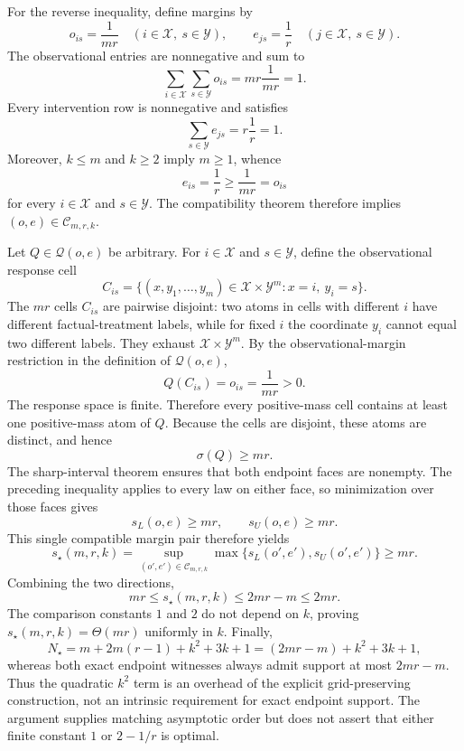 For the reverse inequality, define margins by
\[
o_{is}=\frac1{mr}
\quad(i\in\mathcal X,\ s\in\mathcal Y),
\qquad
e_{js}=\frac1r
\quad(j\in\mathcal X,\ s\in\mathcal Y).
\]
The observational entries are nonnegative and sum to
\[
\sum_{i\in\mathcal X}\sum_{s\in\mathcal Y}o_{is}
=mr\frac1{mr}=1.
\]
Every intervention row is nonnegative and satisfies
\[
\sum_{s\in\mathcal Y}e_{js}=r\frac1r=1.
\]
Moreover, \(k\leq m\) and \(k\geq2\) imply \(m\geq1\), whence
\[
e_{is}=\frac1r\geq\frac1{mr}=o_{is}
\]
for every \(i\in\mathcal X\) and \(s\in\mathcal Y\).  The compatibility theorem therefore implies \((o,e)\in\mathcal C_{m,r,k}\).

Let \(Q\in\mathcal Q(o,e)\) be arbitrary.  For \(i\in\mathcal X\) and \(s\in\mathcal Y\), define the observational response cell
\[
C_{is}=\{(x,y_1,\ldots,y_m)\in\mathcal X\times\mathcal Y^m:x=i,\ y_i=s\}.
\]
The \(mr\) cells \(C_{is}\) are pairwise disjoint: two atoms in cells with different \(i\) have different factual-treatment labels, while for fixed \(i\) the coordinate \(y_i\) cannot equal two different labels.  They exhaust \(\mathcal X\times\mathcal Y^m\).  By the observational-margin restriction in the definition of \(\mathcal Q(o,e)\),
\[
Q(C_{is})=o_{is}=\frac1{mr}>0.
\]
The response space is finite.  Therefore every positive-mass cell contains at least one positive-mass atom of \(Q\).  Because the cells are disjoint, these atoms are distinct, and hence
\[
\sigma(Q)\geq mr.
\]
The sharp-interval theorem ensures that both endpoint faces are nonempty.  The preceding inequality applies to every law on either face, so minimization over those faces gives
\[
s_L(o,e)\geq mr,
\qquad
s_U(o,e)\geq mr.
\]
This single compatible margin pair therefore yields
\[
s_\star(m,r,k)
=\sup_{(o',e')\in\mathcal C_{m,r,k}}
\max\{s_L(o',e'),s_U(o',e')\}
\geq mr.
\]
Combining the two directions,
\[
mr\leq s_\star(m,r,k)\leq2mr-m\leq2mr.
\]
The comparison constants \(1\) and \(2\) do not depend on \(k\), proving \(s_\star(m,r,k)=\Theta(mr)\) uniformly in \(k\).  Finally,
\[
N_\star=m+2m(r-1)+k^2+3k+1
=(2mr-m)+k^2+3k+1,
\]
whereas both exact endpoint witnesses always admit support at most \(2mr-m\).  Thus the quadratic \(k^2\) term is an overhead of the explicit grid-preserving construction, not an intrinsic requirement for exact endpoint support.  The argument supplies matching asymptotic order but does not assert that either finite constant \(1\) or \(2-1/r\) is optimal.
